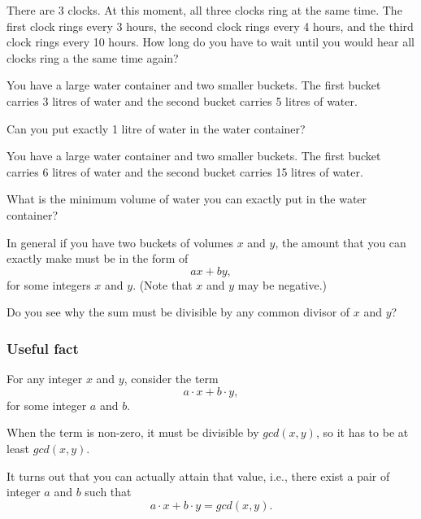

\begin{frame}
  There are 3 clocks.  At this moment, all three clocks ring at the
  same time.  The first clock rings every 3 hours, the second clock
  rings every 4 hours, and the third clock rings every 10 hours.  How
  long do you have to wait until you would hear all clocks ring a the
  same time again?
  
\end{frame}

\begin{frame}
  You have a large water container and two smaller buckets. The first
  bucket carries 3 litres of water and the second bucket carries 5
  litres of water.

  Can you put exactly 1 litre of water in the water container?
\end{frame}

\begin{frame}
  You have a large water container and two smaller buckets. The first
  bucket carries 6 litres of water and the second bucket carries 15
  litres of water.

  What is the minimum volume of water you can exactly put in the water
  container?

  \pause

  \vspace{0.2in}
  In general if you have two buckets of volumes $x$ and $y$, the amount
  that you can exactly make must be in the form of
  \[
  ax + by,
  \]
  for some integers $x$ and $y$.  (Note that $x$ and $y$ may be
  negative.)

  \pause Do you see why the sum must be divisible by any common
  divisor of $x$ and $y$?
\end{frame}

\begin{frame}
  \frametitle{Useful fact}

  For any integer $x$ and $y$, consider the term
  \[
  a\cdot x + b\cdot y,
  \]
  for some integer $a$ and $b$.

  \pause
  When the term is non-zero, it must be divisible by $gcd(x,y)$, so it
  has to be at least $gcd(x,y)$.

  \vspace{0.2in}

  It turns out that you can actually attain that value, i.e.,
  there exist a pair of integer $a$ and
  $b$ such that
  \[
  a\cdot x + b\cdot y = gcd(x,y).
  \]
\end{frame}

